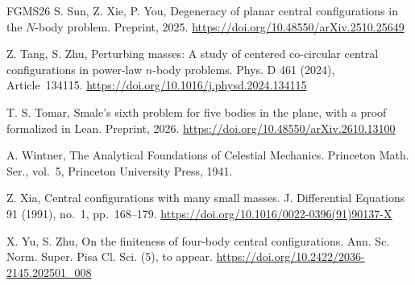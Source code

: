 \documentclass[Threeside,11pt]{article}
\theoremstyle{definition}
\theoremstyle{remark}
\numberwithin{equation}{section}
\theoremstyle{remark}
\begin{document}
\begin{thebibliography}{FGMS26}
S. Sun, Z. Xie, P. You,
Degeneracy of planar central configurations in the $N$-body problem.
Preprint, 2025.
\url{https://doi.org/10.48550/arXiv.2510.25649}

Z. Tang, S. Zhu,
Perturbing masses: A study of centered co-circular central configurations in power-law $n$-body problems.
Phys. D 461 (2024), Article~134115.
\url{https://doi.org/10.1016/j.physd.2024.134115}

T. S. Tomar,
Smale's sixth problem for five bodies in the plane, with a proof
formalized in Lean.
Preprint, 2026.
\url{https://doi.org/10.48550/arXiv.2610.13100}

A. Wintner,
The Analytical Foundations of Celestial Mechanics.
Princeton Math. Ser., vol.~5, Princeton University Press, 1941.

Z. Xia,
Central configurations with many small masses.
J. Differential Equations 91 (1991), no.~1, pp.~168--179.
\url{https://doi.org/10.1016/0022-0396(91)90137-X}

X. Yu, S. Zhu,
On the finiteness of four-body central configurations.
Ann. Sc. Norm. Super. Pisa Cl. Sci. (5), to appear.
\url{https://doi.org/10.2422/2036-2145.202501_008}
\end{thebibliography}
\end{document}
